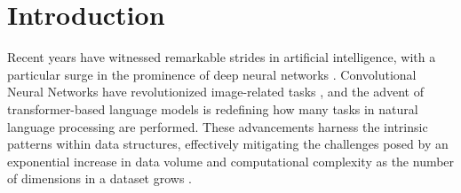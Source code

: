 \section{Introduction}
\label{s_Introduction}

Recent years have witnessed remarkable strides in artificial intelligence, with a particular surge in the prominence of deep neural networks \cite{prado-romero_survey_2023}. Convolutional Neural Networks have revolutionized image-related tasks \cite{szegedy_going_2015}, and the advent of transformer-based language models \cite{vaswani_attention_2017, brown_language_2020} is redefining how many tasks in natural language processing are performed. These advancements harness the intrinsic patterns within data structures, effectively mitigating the challenges posed by an exponential increase in data volume and computational complexity as the number of dimensions in a dataset grows \cite{bronstein_geometric_2017, bronstein_geometric_2021, bellman_dynamic_1966}.


